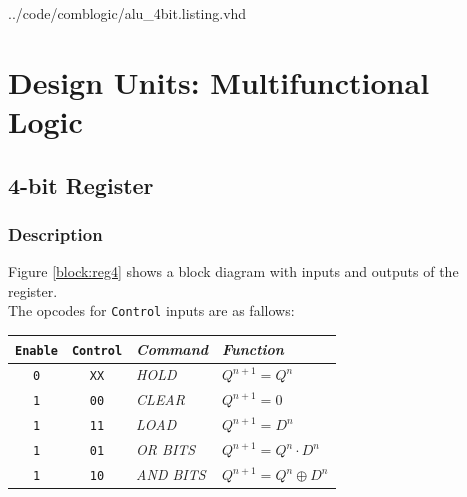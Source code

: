 \documentclass[10pt,a4paper]{report}
\begin{document}

{../code/comblogic/alu_4bit.listing.vhd}


\chapter{Design Units: Multifunctional Logic}

\section{4-bit Register}
\subsection{Description}

 Figure \ref{block:reg4} shows a block diagram with
 inputs and outputs of the register. \\ The opcodes for
 \texttt{Control} inputs are as fallows:

 \begin{tabular}{|c|c|l l|}
 \hline
 \texttt{Enable} & \texttt{Control}  & \emph{Command} & \emph{Function} \\
 \hline

 \texttt{0} & \texttt{XX} & \emph{HOLD} & $Q^{n+1} = Q^n$ \\

 \texttt{1} & \texttt{00} & \emph{CLEAR} & $Q^{n+1} = 0$ \\

 \texttt{1} & \texttt{11} & \emph{LOAD} & $Q^{n+1} = D^n$ \\

 \texttt{1} & \texttt{01} & \emph{OR BITS} & $Q^{n+1} = Q^n \cdot D^n$ \\

 \texttt{1} & \texttt{10} & \emph{AND BITS} & $Q^{n+1} = Q^n \oplus D^n$ \\

 \hline

 \end{tabular}
\end{document}
